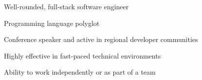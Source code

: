 

\begin{cvparagraph}

      \begin{cvitems}
        \item Well-rounded, full-stack software engineer
        \item Programming language polyglot
        \item Conference speaker and active in regional developer communities
        \item Highly effective in fast-paced technical environments
        \item Ability to work independently or as part of a team
      \end{cvitems}

\end{cvparagraph}
